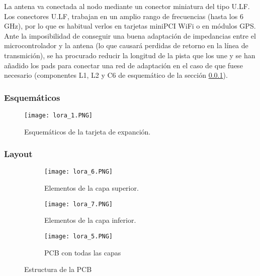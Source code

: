 La antena va conectada al nodo mediante un conector miniatura del tipo U.LF. Los conectores U.LF, trabajan en un amplio rango de frecuencias (hasta los 6 GHz), por lo que es habitual verlos en tarjetas miniPCI WiFi o en módulos GPS. Ante la imposibilidad de conseguir una buena adaptación de impedancias entre el microcontrolador y la antena (lo que causará perdidas de retorno en la línea de transmición), se ha procurado reducir la longitud de la pista que los une y se han añadido los pads para conectar una red de adaptación en el caso de que fuese necesario (componentes L1, L2 y C6 de esquemático de la sección \ref{hard:nodeSCH}).
				
		
		\pagebreak

		\subsubsection{Esquemáticos} \label{hard:nodeSCH}
	\begin{figure}[hbt!]
		\centering
		\texttt{[image: lora\_1.PNG]}
		\caption{Esquemáticos de la tarjeta de expanción.}
		\label{fig:car13}
	\end{figure}		
	\pagebreak


		\subsubsection{Layout} \label{hard:nodeLay}
		
		
		\begin{figure}[htb!]
            \centering
            \hfill
            \begin{subfigure}[t]{0.35\textwidth}
                \texttt{[image: lora\_6.PNG]}
                \caption{Elementos de la capa superior.}
            \end{subfigure}%
            \hfill
            \begin{subfigure}[t]{0.35\textwidth}
                \texttt{[image: lora\_7.PNG]}
                \caption{Elementos de la capa inferior.}
            \end{subfigure}
            \hfill
            \begin{subfigure}[t]{0.35\textwidth}
    			\centering
    			\texttt{[image: lora\_5.PNG]}
    			\caption{PCB con todas las capas}
    		\end{subfigure}
    		
    		\caption{Estructura de la PCB}
    		\label{fig:PCBnode}

        \end{figure}
        
